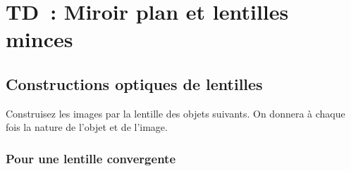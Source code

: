 \documentclass[../../main/main.tex]{subfiles}
\begin{document}
\setcounter{chapter}{2}
\setlength{\columnseprule}{0pt}

\chapter{TD~: Miroir plan et lentilles minces}

\section{Constructions optiques de lentilles}

Construisez les images par la lentille des objets suivants. On donnera à chaque
fois la nature de l'objet et de l'image.

\subsection{Pour une lentille convergente}
\end{document}
